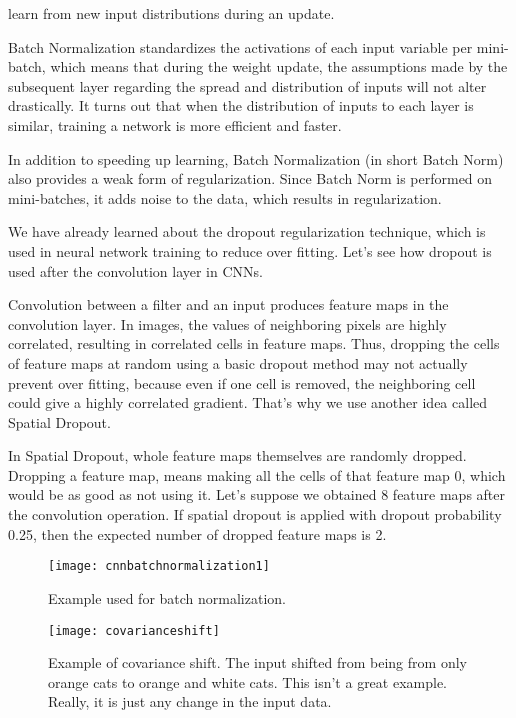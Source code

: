 \begin{bulletedlist}
learn from new input distributions during an update.
		\item Batch Normalization standardizes the activations of each input variable per mini-batch, which means that during the weight update, the assumptions made by the subsequent layer regarding the spread and distribution of inputs will not alter drastically. It turns out that when the distribution of inputs to each layer is similar, training a network is more efficient and faster.
		\item In addition to speeding up learning, Batch Normalization (in short Batch Norm) also provides a weak form of regularization. Since Batch Norm is performed on mini-batches, it adds noise to the data, which results in regularization.
		\item We have already learned about the dropout regularization technique, which is used in neural network training to reduce over fitting.  Let's see how dropout is used after the convolution layer in CNNs.
		\item Convolution between a filter and an input produces feature maps in the convolution layer.  In images, the values of neighboring pixels are highly correlated, resulting in correlated cells in feature maps.  Thus, dropping the cells of feature maps at random using a basic dropout method may not actually prevent over fitting, because even if one cell is removed, the neighboring cell
could give a highly correlated gradient.  That's why we use another idea called Spatial Dropout.
		\item In Spatial Dropout, whole feature maps themselves are randomly dropped.  Dropping a feature map, means making all the cells of that feature map 0, which would be as good as not using it.  Let's suppose we obtained 8 feature maps after the convolution operation. If spatial dropout is applied with dropout probability 0.25, then the expected number of dropped feature maps is 2.
		\begin{bulletedlist}
			\item
		\end{bulletedlist}
	\end{bulletedlist}

	\begin{figure}[tbh]
		\centering
		\texttt{[image: cnnbatchnormalization1]}
		\caption[Example used for batch normalization]{Example used for batch normalization.}
		\label{fig:cnnbatchnormalization1}
	\end{figure}

	\begin{figure}[tbh]
		\centering
		\texttt{[image: covarianceshift]}
		\caption[Example of covariance shift]{Example of covariance shift.  The input shifted from being from only orange cats to orange and white cats.  This isn't a great example.  Really, it is just any change in the input data.}
		\label{fig:covarianceshift}
	\end{figure}

